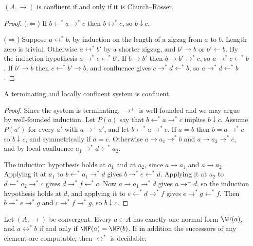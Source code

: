\begin{lemma}
\label{lem:cr}
$(A,\to)$ is confluent if and only if it is Church--Rosser.
\end{lemma}

\begin{proof}
($\Leftarrow$) If $b\leftarrow^{*}a\to^{*}c$ then $b\leftrightarrow^{*}c$, so $b\downarrow c$.

($\Rightarrow$) Suppose $a\leftrightarrow^{*}b$, by induction on the length of a zigzag from $a$ to $b$. Length zero is trivial. Otherwise $a\leftrightarrow^{*}b'$ by a shorter zigzag, and $b'\to b$ or $b'\leftarrow b$. By the induction hypothesis $a\to^{*}c\leftarrow^{*}b'$. If $b\to b'$ then $b\to b'\to^{*}c$, so $a\to^{*}c\leftarrow^{*}b$. If $b'\to b$ then $c\leftarrow^{*}b'\to b$, and confluence gives $c\to^{*}d\leftarrow^{*}b$, so $a\to^{*}d\leftarrow^{*}b$.
\end{proof}

\begin{theorem}
\label{thm:newman}
A terminating and locally confluent system is confluent.
\end{theorem}

\begin{proof}
Since the system is terminating, $\to^{+}$ is well-founded and we may argue by well-founded induction. Let $P(a)$ say that $b\leftarrow^{*}a\to^{*}c$ implies $b\downarrow c$. Assume $P(a')$ for every $a'$ with $a\to^{+}a'$, and let $b\leftarrow^{*}a\to^{*}c$. If $a=b$ then $b=a\to^{*}c$ so $b\downarrow c$, and symmetrically if $a=c$. Otherwise $a\to a_1\to^{*}b$ and $a\to a_2\to^{*}c$, and by local confluence $a_1\to^{*}d\leftarrow^{*}a_2$.

The induction hypothesis holds at $a_1$ and at $a_2$, since $a\to a_1$ and $a\to a_2$. Applying it at $a_1$ to $b\leftarrow^{*}a_1\to^{*}d$ gives $b\to^{*}e\leftarrow^{*}d$. Applying it at $a_2$ to $d\leftarrow^{*}a_2\to^{*}c$ gives $d\to^{*}f\leftarrow^{*}c$. Now $a\to a_1\to^{*}d$ gives $a\to^{+}d$, so the induction hypothesis holds at $d$, and applying it to $e\leftarrow^{*}d\to^{*}f$ gives $e\to^{*}g\leftarrow^{*}f$. Then $b\to^{*}e\to^{*}g$ and $c\to^{*}f\to^{*}g$, so $b\downarrow c$.
\end{proof}

\begin{corollary}
\label{cor:nf}
Let $(A,\to)$ be convergent. Every $a\in A$ has exactly one normal form $\NF(a)$, and $a\leftrightarrow^{*}b$ if and only if $\NF(a)=\NF(b)$. If in addition the successors of any element are computable, then $\leftrightarrow^{*}$ is decidable.
\end{corollary}

